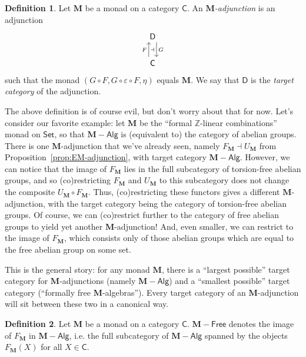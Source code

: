 \documentclass{article}
\theoremstyle{definition}
\newtheorem{defn}{Definition}
\newcommand{\C}{\mathsf{C}}
\newcommand{\D}{\mathsf{D}}
\newcommand{\M}{\mathbf{M}}
\newcommand{\ZZ}{\mathbb{Z}}
\newcommand{\Alg}{\mathsf{Alg}}
\newcommand{\Free}{\mathsf{Free}}
\begin{document}
\begin{defn}
Let $\M$ be a monad on a category $\C$. An \emph{$\M$-adjunction} is an adjunction
\[\begin{tikzcd}[ampersand replacement=\&]
	\D \\
	\C
	\arrow[""{name=0, anchor=center, inner sep=0}, "G", shift left=2, from=1-1, to=2-1]
	\arrow[""{name=1, anchor=center, inner sep=0}, "F", shift left=2, from=2-1, to=1-1]
	\arrow["\dashv"{anchor=center}, draw=none, from=1, to=0]
\end{tikzcd}\]
such that the monad $(G \circ F, G \circ \varepsilon \circ F, \eta)$ equals $\M$. We say that $\D$ is the \emph{target category} of the adjunction.
\end{defn}

The above definition is of course evil, but don't worry about that for now. Let's consider our favorite example: let $\M$ be the ``formal $\ZZ$-linear combinations'' monad on $\mathsf{Set}$, so that $\M{-}\Alg$ is (equivalent to) the category of abelian groups. There is one $\M$-adjunction that we've already seen, namely $F_{\M} \dashv U_{\M}$ from Proposition~\ref{prop:EM-adjunction}, with target category $\M{-}\Alg$. However, we can notice that the image of $F_{\M}$ lies in the full subcategory of torsion-free abelian groups, and so (co)restricting $F_{\M}$ and $U_{\M}$ to this subcategory does not change the composite $U_{\M} \circ F_{\M}$. Thus, (co)restricting these functors gives a different $\M$-adjunction, with the target category being the category of torsion-free abelian groups. Of course, we can (co)restrict further to the category of free abelian groups to yield yet another $\M$-adjunction! And, even smaller, we can restrict to the image of $F_{\M}$, which consists only of those abelian groups which are equal to the free abelian group on some set.

This is the general story: for any monad $\M$, there is a ``largest possible'' target category for $\M$-adjunctions (namely $\M{-}\Alg$) and a ``smallest possible'' target category (``formally free $\M$-algebras''). Every target category of an $\M$-adjunction will sit between these two in a canonical way.

\begin{defn}
Let $\M$ be a monad on a category $\C$. $\M{-}\Free$ denotes the image of $F_{\M}$ in $\M{-}\Alg$, i.e. the full subcategory of $\M{-}\Alg$ spanned by the objects $F_{\M}(X)$ for all $X \in \C$.
\end{defn}
\end{document}
